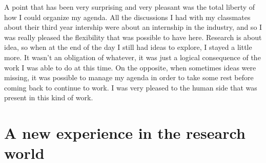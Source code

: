 \documentclass{report}
\begin{document}
		A point that has been very surprising and very pleasant was the total liberty of how I could organize my agenda. All the discussions I had with my classmates about their third year intership were about an internship in the industry, and so I was really pleased the flexibility that was possible to have here. Research is about idea, so when at the end of the day I still had ideas to explore, I stayed a little more. It wasn't an obligation of whatever, it was just a logical consequence of the work I was able to do at this time. On the opposite, when sometimes ideas were missing, it was possible to manage my agenda in order to take some rest before coming back to continue to work. I was very pleased to the human side that was present in this kind of work.
		
		\section{A new experience in the research world}
		
\end{document}
